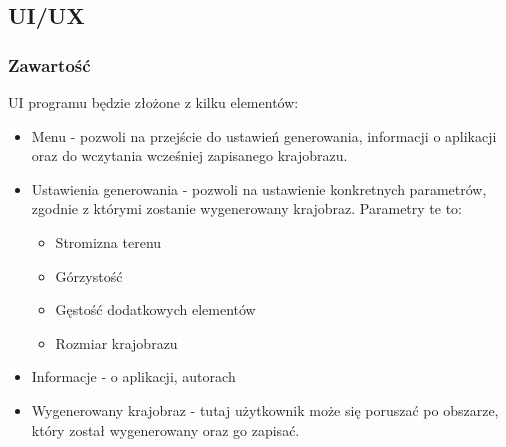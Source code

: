 \documentclass[12pt,a4paper]{article}
\begin{document}
\subsection{UI/UX}
\subsubsection{Zawartość}
UI programu będzie złożone z kilku elementów:
\begin{itemize}
\item Menu - pozwoli na przejście do ustawień generowania, informacji o aplikacji oraz do wczytania wcześniej zapisanego krajobrazu.
\item Ustawienia generowania - pozwoli na ustawienie konkretnych parametrów, zgodnie z którymi zostanie wygenerowany krajobraz. Parametry te to: 
	\begin{itemize}
	\item Stromizna terenu
	\item Górzystość
	\item Gęstość dodatkowych elementów
	\item Rozmiar krajobrazu
	\end{itemize}
	\item Informacje - o aplikacji, autorach
	\item Wygenerowany krajobraz - tutaj użytkownik może się poruszać po obszarze, który został wygenerowany oraz go zapisać.
\end{itemize}
\end{document}
